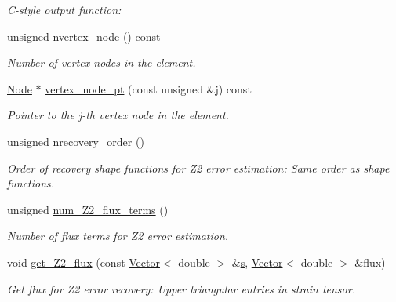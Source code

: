 \begin{DoxyCompactItemize}
\begin{DoxyCompactList}\small\item\em C-\/style output function\+: \end{DoxyCompactList}\item 
unsigned \hyperlink{classoomph_1_1TTimeHarmonicLinearElasticityElement_ace9f72ad0f5b88d08f8364a8acc673b0}{nvertex\+\_\+node} () const
\begin{DoxyCompactList}\small\item\em Number of vertex nodes in the element. \end{DoxyCompactList}\item 
\hyperlink{classoomph_1_1Node}{Node} $\ast$ \hyperlink{classoomph_1_1TTimeHarmonicLinearElasticityElement_a18f6af257eff39c097cc70e49b9832a8}{vertex\+\_\+node\+\_\+pt} (const unsigned \&j) const
\begin{DoxyCompactList}\small\item\em Pointer to the j-\/th vertex node in the element. \end{DoxyCompactList}\item 
unsigned \hyperlink{classoomph_1_1TTimeHarmonicLinearElasticityElement_a15e0965ae89f4c6523fe61784aada176}{nrecovery\+\_\+order} ()
\begin{DoxyCompactList}\small\item\em Order of recovery shape functions for Z2 error estimation\+: Same order as shape functions. \end{DoxyCompactList}\item 
unsigned \hyperlink{classoomph_1_1TTimeHarmonicLinearElasticityElement_a5cce049fe8015dc639df9b028a6b187e}{num\+\_\+\+Z2\+\_\+flux\+\_\+terms} ()
\begin{DoxyCompactList}\small\item\em Number of \textquotesingle{}flux\textquotesingle{} terms for Z2 error estimation. \end{DoxyCompactList}\item 
void \hyperlink{classoomph_1_1TTimeHarmonicLinearElasticityElement_a62ff51ac6f51d39ccc8220203f679392}{get\+\_\+\+Z2\+\_\+flux} (const \hyperlink{classoomph_1_1Vector}{Vector}$<$ double $>$ \&\hyperlink{cfortran_8h_ab7123126e4885ef647dd9c6e3807a21c}{s}, \hyperlink{classoomph_1_1Vector}{Vector}$<$ double $>$ \&flux)
\begin{DoxyCompactList}\small\item\em Get \textquotesingle{}flux\textquotesingle{} for Z2 error recovery\+: Upper triangular entries in strain tensor. \end{DoxyCompactList}\end{DoxyCompactItemize}
